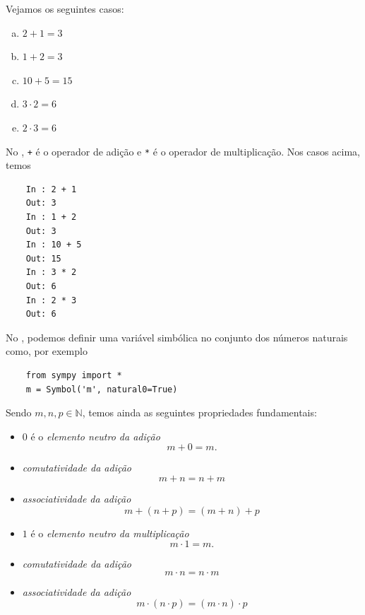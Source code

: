 \begin{ex}
  Vejamos os seguintes casos:
  \begin{enumerate}[a)]
  \item $2 + 1 = 3$
  \item $1 + 2 = 3$
  \item $10 + 5 = 15$
  \item $3\cdot 2 = 6$
  \item $2\cdot 3 = 6$
  \end{enumerate}

  \ifispython
  No \python, \lstinline!+! é o operador de adição e \lstinline!*! é o operador de multiplicação. Nos casos acima, temos
  \begin{lstlisting}
    In : 2 + 1
    Out: 3
    In : 1 + 2
    Out: 3
    In : 10 + 5
    Out: 15
    In : 3 * 2
    Out: 6
    In : 2 * 3
    Out: 6
  \end{lstlisting}
  \fi
\end{ex}

\ifispython
\begin{obs}
  No \python, podemos definir uma variável simbólica no conjunto dos números naturais como, por exemplo
  \begin{lstlisting}
    from sympy import *
    m = Symbol('m', natural0=True)
  \end{lstlisting}
\end{obs}
\fi

Sendo $m, n, p\in\mathbb{N}$, temos ainda as seguintes propriedades fundamentais:
\begin{itemize}
\item $0$ é o \emph{elemento neutro da adição}
  \begin{equation}
    m + 0 = m.
  \end{equation}
\item \emph{comutatividade da adição}
  \begin{equation}
    m + n = n + m
  \end{equation}
\item \emph{associatividade da adição}
  \begin{equation}
    m + (n + p) = (m + n) + p
  \end{equation}
\item $1$ é o \emph{elemento neutro da multiplicação}
  \begin{equation}
    m \cdot 1 = m.
  \end{equation}
\item \emph{comutatividade da adição}
  \begin{equation}
    m \cdot n = n \cdot m
  \end{equation}
\item \emph{associatividade da adição}
  \begin{equation}
    m \cdot (n \cdot p) = (m \cdot n) \cdot p
  \end{equation}
\end{itemize}

